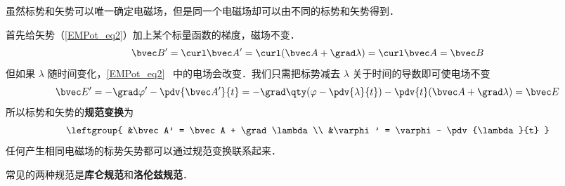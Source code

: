

虽然标势和矢势可以唯一确定电磁场，但是同一个电磁场却可以由不同的标势和矢势得到．

首先给矢势（\autoref{EMPot_eq2}）加上某个标量函数的梯度，磁场不变．
\begin{equation}
\bvec B' = \curl \bvec A' = \curl (\bvec A + \grad \lambda) = \curl \bvec A = \bvec B
\end{equation}
但如果 $\lambda$ 随时间变化，\autoref{EMPot_eq2}~ 中的电场会改变．我们只需把标势减去 $\lambda$ 关于时间的导数即可使电场不变
\begin{equation}
\bvec E' = -\grad \varphi' - \pdv{\bvec A'}{t} = -\grad \qty(\varphi - \pdv{\lambda}{t}) - \pdv{t} (\bvec A + \grad \lambda) = \bvec E
\end{equation}
所以标势和矢势的\textbf{规范变换}为
\begin{equation}\label{Gauge_eq3}
\leftgroup{
&\bvec A' = \bvec A + \grad \lambda\\
&\varphi' = \varphi - \pdv{\lambda}{t}
}\end{equation}
任何产生相同电磁场的标势矢势都可以通过规范变换联系起来．

常见的两种规范是\textbf{库仑规范}和\textbf{洛伦兹规范}．
